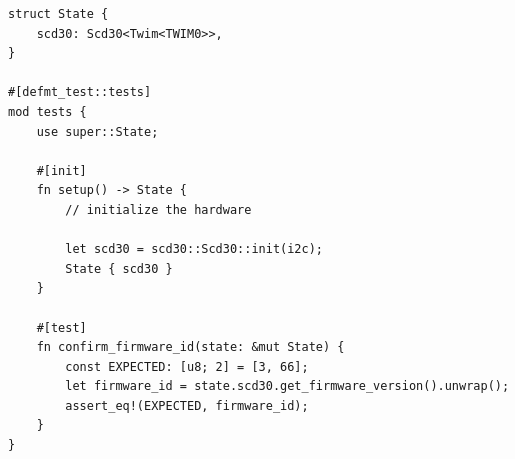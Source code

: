\begin{lstlisting}[caption={Integration test written using defmt\textendash test.},label=lst:defmttest]
struct State {
    scd30: Scd30<Twim<TWIM0>>,
}

#[defmt_test::tests]
mod tests {
    use super::State;

    #[init]
    fn setup() -> State {
        // initialize the hardware

        let scd30 = scd30::Scd30::init(i2c);
        State { scd30 }
    }

    #[test]
    fn confirm_firmware_id(state: &mut State) {
        const EXPECTED: [u8; 2] = [3, 66];
        let firmware_id = state.scd30.get_firmware_version().unwrap();
        assert_eq!(EXPECTED, firmware_id);
    }
}
\end{lstlisting}

